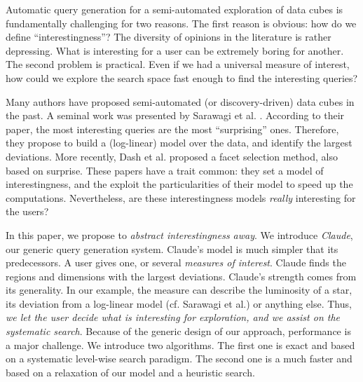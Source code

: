 Automatic query generation for a semi-automated exploration of data cubes is fundamentally challenging for two reasons. The first
reason is obvious: how do we define ``interestingness''?  The diversity of
opinions in the literature is rather depressing. What is interesting for a
user can be extremely boring for another. The second problem is practical.
Even if we had a universal measure of interest, how could we explore the search
space fast enough to find the interesting queries?

Many authors have proposed semi-automated (or discovery-driven) data cubes in the past.  A seminal work was
presented by Sarawagi et al. \cite{sarawagi1998discovery}. According to their
paper, the most interesting queries are the most ``surprising'' ones.
Therefore, they propose to build a (log-linear) model over the data, and
identify the largest deviations. More recently, Dash et
al.\cite{dash2008dynamic} proposed a facet selection method, also based on
surprise. These papers have a trait common: they set a model of
interestingness, and the exploit the particularities of their model to speed up
the computations. Nevertheless, are these interestingness models \emph{really}
interesting for the users?

In this paper, we propose to \emph{abstract interestingness away}. We introduce
\textit{Claude}, our generic query generation system. Claude's model is much simpler
that its predecessors. A user gives one, or several \emph{measures of
interest}. Claude finds the regions and dimensions with the largest deviations. Claude's
strength comes from its generality. In our example, the measure can describe the luminosity of a
star, its deviation from a log-linear model (cf. Sarawagi et al.) or anything
else. Thus, \emph{we let the user decide what is interesting for exploration, and we assist on
the systematic search}. Because of the generic design of our approach, performance is a major
challenge. We introduce two algorithms. The first one is exact and based on a systematic
level-wise search paradigm. The second one is a much faster and based on a relaxation of our model and a heuristic search.
